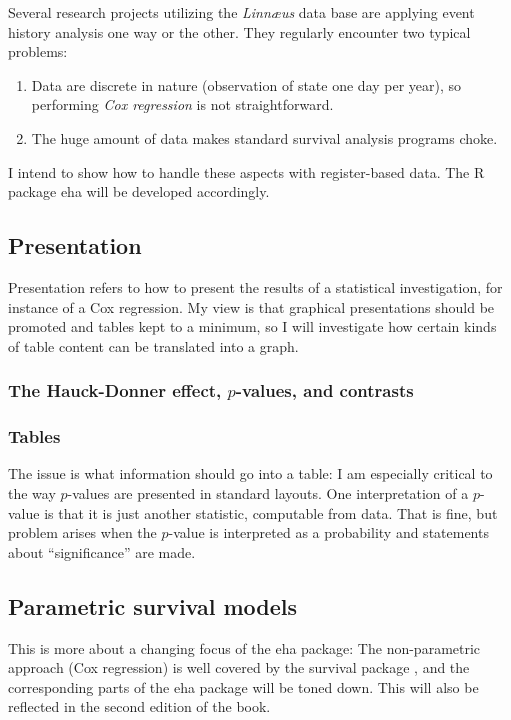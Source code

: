 \documentclass[a4paper,11pt]{article}
\begin{document}
Several research projects utilizing the \emph{Linn{\ae}us} data base are
applying event history analysis one way or the other. They regularly
encounter two typical problems:

\begin{enumerate}

\item Data are discrete in nature (observation of state one day per year),
  so performing \emph{Cox regression} is not straightforward.
\item The huge amount of data makes standard survival analysis programs
  choke.
\end{enumerate}  

I intend to show how to handle these aspects with register-based data. The
R package eha \citep{eha} will be developed accordingly.

\subsection{Presentation}

Presentation refers to how to present the results of a statistical
investigation, for instance of a Cox regression. My view is that graphical
presentations should be promoted and tables kept to a minimum, so I will
investigate how certain kinds of table content can be translated into a graph.

\subsubsection{The Hauck-Donner effect, $p$-values, and contrasts}

\subsubsection{Tables}

The issue is what information should go into a table: I am especially
critical to the way $p$-values are presented in standard layouts.  One
interpretation of a $p$-value is that it is just another statistic,
computable from data. That is fine, but problem arises when the $p$-value is
interpreted as a probability and statements about ``significance'' are made.

\subsection{Parametric survival models}

This is more about a changing focus of the eha package: The non-parametric
approach (Cox regression) is well covered by the survival package
\citep{survival}, and the corresponding parts of the eha package will be
toned down. This will also be reflected in the second edition of the book. 
\end{document}
